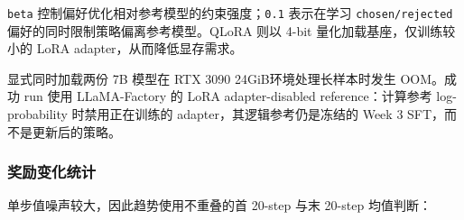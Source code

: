\documentclass[UTF8,fontset=fandol,a4paper,11pt]{ctexart}
\begin{document}
\nolinkurl{beta} 控制偏好优化相对参考模型的约束强度；\nolinkurl{0.1}
表示在学习 {\nolinkurl{chosen/rejected}}
偏好的同时限制策略偏离参考模型。QLoRA 则以 4-bit
量化加载基座，仅训练较小的 LoRA adapter，从而降低显存需求。

显式同时加载两份 7B 模型在 RTX 3090 24GiB环境处理长样本时发生 OOM。成功
run 使用 LLaMA-Factory 的 LoRA adapter-disabled reference：计算参考
log-probability 时禁用正在训练的 adapter，其逻辑参考仍是冻结的 Week 3
SFT，而不是更新后的策略。

\subsubsection{奖励变化统计}\label{ux5956ux52b1ux53d8ux5316ux7edfux8ba1}

单步值噪声较大，因此趋势使用不重叠的首 20-step 与末 20-step 均值判断：

\Needspace{115pt}
\end{document}

